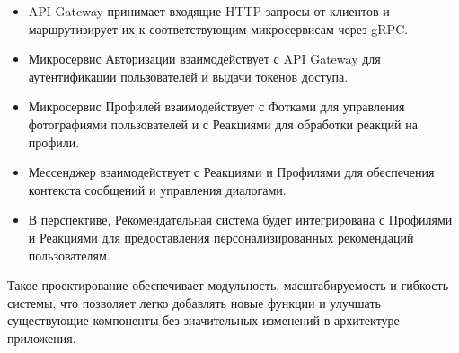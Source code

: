 \begin{itemize}
    \item API Gateway принимает входящие HTTP-запросы от клиентов и маршрутизирует их к соответствующим микросервисам через gRPC.
    \item Микросервис Авторизации взаимодействует с API Gateway для аутентификации пользователей и выдачи токенов доступа.
    \item Микросервис Профилей взаимодействует с Фотками для управления фотографиями пользователей и с Реакциями для обработки реакций на профили.
    \item Мессенджер взаимодействует с Реакциями и Профилями для обеспечения контекста сообщений и управления диалогами.
    \item В перспективе, Рекомендательная система будет интегрирована с Профилями и Реакциями для предоставления персонализированных рекомендаций пользователям.
\end{itemize}

Такое проектирование обеспечивает модульность, масштабируемость и гибкость системы, что позволяет легко добавлять новые функции и улучшать существующие компоненты без значительных изменений в архитектуре приложения.
